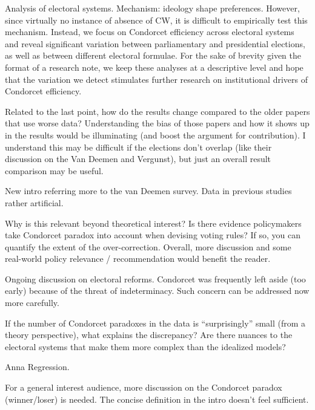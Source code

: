 \documentclass[a4paper, 12pt]{scrartcl}
\theoremstyle{break}
\newenvironment{changes}{\par\color{violet}\par\addvspace{\baselineskip}}{\par\addvspace{\baselineskip}}
\begin{document}
Analysis of electoral systems. Mechanism: ideology shape preferences. However, since virtually no instance of absence of CW, it is difficult to empirically test this mechanism. Instead, we focus on Condorcet efficiency across electoral systems and reveal significant variation between parliamentary and presidential elections, as well as between different electoral formulae. For the sake of brevity given the format of a research note, we keep these analyses at a descriptive level and hope that the variation we detect stimulates further research on institutional drivers of Condorcet efficiency.  

\begin{changes}
	Related to the last point, how do the results change compared to the older papers that use worse data? Understanding the bias of those papers and how it shows up in the results would be illuminating (and boost the argument for contribution). I understand this may be difficult if the elections don’t overlap (like their discussion on the Van
	Deemen and Vergunst), but just an overall result comparison may be useful.
\end{changes}

New intro referring more to the van Deemen survey. Data in previous studies rather artificial.

\begin{changes}
	Why is this relevant beyond theoretical interest? Is there evidence policymakers take Condorcet paradox into account when devising voting rules? If so, you can quantify the extent of the over-correction. Overall, more discussion and some real-world policy relevance / recommendation would benefit the reader.
\end{changes}

Ongoing discussion on electoral reforms. Condorcet was frequently left aside (too early) because of the threat of indeterminacy. Such concern can be addressed now more carefully.

\begin{changes}
	If the number of Condorcet paradoxes in the data is ``surprisingly'' small (from a theory perspective), what explains the discrepancy? Are there nuances to the electoral systems that make them more complex than the idealized models?
\end{changes}

Anna Regression.

\begin{changes}
	For a general interest audience, more discussion on the Condorcet paradox (winner/loser) is needed. The concise definition in the intro doesn’t feel sufficient.
\end{changes}
\end{document}
